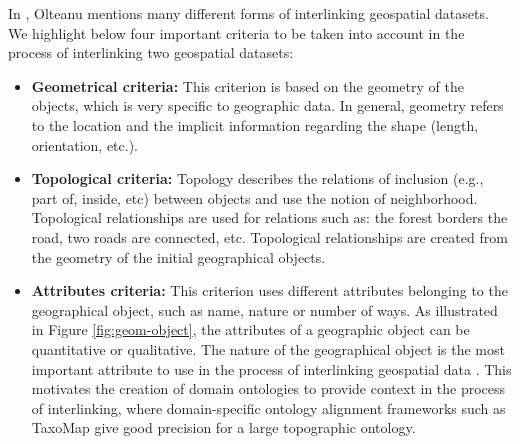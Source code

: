 In \cite{anamaria08}, Olteanu mentions many different forms of interlinking geospatial datasets. We highlight below four important criteria to be taken into account in the process of interlinking two geospatial datasets:
\begin{itemize}
\item \textbf{Geometrical criteria:} This criterion is based on the geometry of the objects, which is very specific to geographic data. In general, geometry refers to the location and the implicit information regarding the shape (length, orientation, etc.).
\item \textbf{Topological criteria:}
Topology describes the relations of inclusion (e.g., part of, inside, etc) between objects and use the notion of neighborhood. Topological relationships are used for relations such as: the forest borders the road, two roads are connected, etc. Topological relationships are created from the geometry of the initial geographical objects.

\item \textbf{Attributes criteria:} This criterion uses different attributes belonging to the geographical object, such as name, nature or number of ways. As illustrated in Figure \ref{fig:geom-object}, the attributes of a geographic object can be quantitative or qualitative. The nature of the geographical object is the most important attribute to use in the process of interlinking geospatial data \cite{anamaria08}. This motivates the creation of domain ontologies to provide context in the process of interlinking, where domain-specific ontology alignment frameworks such as TaxoMap \cite{reynaud2007,hamdi2010} give good precision for a large topographic ontology.

\end{itemize}

